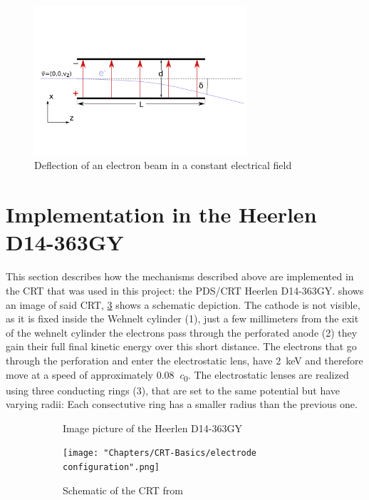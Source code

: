 \begin{figure}
	\centering
	\includegraphics[width=0.7\textwidth]{Chapters/CRT-Basics/DeflectionPlate2}
	\caption{Deflection of an electron beam in a constant electrical field}
	\label{fig:deflectionplate2}
\end{figure}

\section{Implementation in the Heerlen D14-363GY }

This section describes how the mechanisms described above are implemented in the CRT that was used in this project: the PDS/CRT Heerlen D14-363GY.  shows an image of said CRT, \cref{fig:SchemeCRT} shows a schematic depiction. The cathode is not visible, as it is fixed inside the Wehnelt cylinder (1), just a few millimeters from the exit of the wehnelt cylinder the electrons pass through the perforated anode (2) they gain their full final kinetic energy over this short distance. The electrons that go through the perforation and enter the electrostatic lens, have \SI{2}{\kilo\electronvolt} and therefore move at a speed of approximately \SI{0.08}{\clight}. 
The electrostatic lenses are realized using three conducting rings (3), that are set to the same potential but have varying radii: Each consectutive ring has a smaller radius than the previous one. 

\begin{figure}
	\centering
	\begin{subfigure}{.5\textwidth}
		\centering
		\caption{Image picture of the Heerlen D14-363GY}
		\label{fig:FotoCRT}
	\end{subfigure}%
	\begin{subfigure}{.5\textwidth}
		\centering
		\texttt{[image: "Chapters/CRT-Basics/electrode configuration".png]}
		\caption{Schematic of the CRT from \cite{D14363GY123-manual}}
		\label{fig:SchemeCRT}
	\end{subfigure}
	\caption{}
	\label{}
\end{figure}


